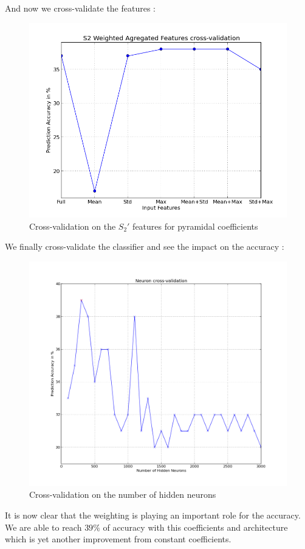 \documentclass[a4paper]{report}
\begin{document}
And now we cross-validate the features :
\begin{figure}[H]
\begin{center}
\includegraphics[scale=0.5]{cross_features_S0_S1_weighted.png}\caption{Cross-validation on the $S_2'$ features for pyramidal coefficients}
\end{center}
\end{figure}
We finally cross-validate the classifier and see the impact on the accuracy :
\begin{figure}[H]
\begin{center}
\includegraphics[scale=0.3]{cross_neuron_S2_weighted.png}\caption{Cross-validation on the number of hidden neurons}
\end{center}
\end{figure}
It is now clear that the weighting is playing an important role for the accuracy. We are able to reach $39\%$ of accuracy with this coefficients and architecture which is yet another improvement from constant coefficients.
\end{document}
